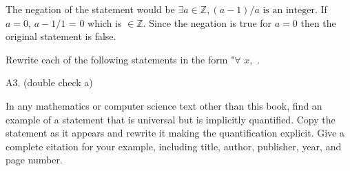 \documentclass[12pt,letterpaper, onecolumn]{exam}
\begin{document}
\begin{questions}
	\begin{solution}
		The negation of the statement would be $\exists a \in \mathbb{Z}, (a-1)/a \textrm{ is an integer.}$
		If $a=0$, $a-1/1$ = $0$ which is $\in \mathbb{Z}$. Since the negation is true for $a=0$ then the original statement is false.
	\end{solution}
	
	\question Rewrite each of the following statements in the form "$\forall$  \makebox[1cm]{\hrulefill} $x,$  \makebox[1cm]{\hrulefill}.
	
	\begin{solution}
		A3. (double check a)
	\end{solution}
	
	\question In any mathematics or computer science text other than this book, find an example of a statement that is universal but is implicitly quantified. Copy the statement as it appears and rewrite it making the quantification explicit. Give a complete citation for your example, including title, author, publisher, year, and page number.
	

\end{questions}
\end{document}
